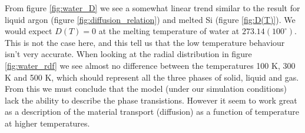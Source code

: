 \documentclass[reprint, amsmath, amssymb, aps]{revtex4-2}
\begin{document}
From figure \ref{fig:water_D} we see a somewhat linear trend similar to the result for liquid argon (figure \ref{fig:diffusion_relation}) and melted Si (figure \ref{fig:D(T)}). We would expect $D(T) = 0$ at the melting temperature of water at $273.14 (100 ^{\circ})$. This is not the case here, and this tell us that the low temperature behaviour isn't very accurate. When looking at the radial distribution in figure \ref{fig:water_rdf} we see almost no difference between the temperatures 100 K, 300 K and 500 K, which should represent all the three phases of solid, liquid and gas. From this we must conclude that the model (under our simulation conditions) lack the ability to describe the phase transistions. However it seem to work great as a description of the material transport (diffusion) as a function of temperature at higher temperatures.




\end{document}

